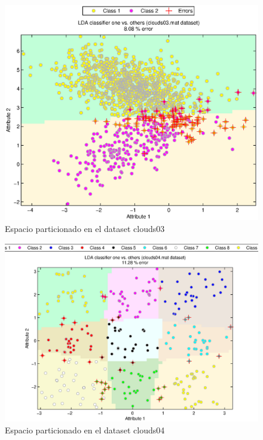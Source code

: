 \documentclass[journal]{IEEEtran}
\begin{document}
\begin{figure}[tb]
	\begin{center}
		\includegraphics[width=\columnwidth]{imagenes/clouds03}
	\end{center}
	\caption{Espacio particionado en el dataset clouds03}
	\label{fig:lda-dataset-03}
\end{figure}

\begin{figure}[tb]
	\begin{center}
		\includegraphics[width=\columnwidth]{imagenes/clouds04}
	\end{center}
	\caption{Espacio particionado en el dataset clouds04}
	\label{fig:lda-dataset-04}
\end{figure}
\end{document}
